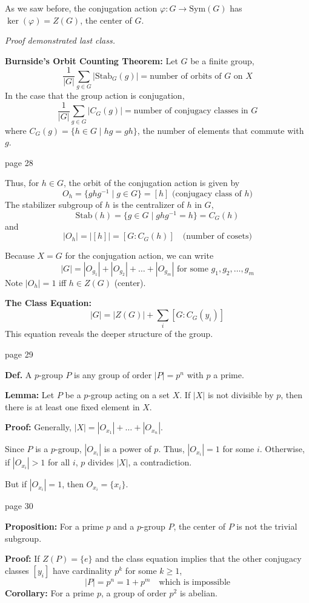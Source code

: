 \documentclass{article}
\begin{document}
As we saw before, the conjugation action $\varphi: G \to \text{Sym}(G)$ has $\ker(\varphi) = Z(G)$, the center of $G$.

\textit{Proof demonstrated last class.}

\textbf{Burnside's Orbit Counting Theorem:}
Let $G$ be a finite group,
\[
\frac{1}{|G|} \sum_{g \in G} | \text{Stab}_G(g) | = \text{number of orbits of } G \text{ on } X
\]
In the case that the group action is conjugation,
\[
\frac{1}{|G|} \sum_{g \in G} | C_G(g) | = \text{number of conjugacy classes in } G
\]
where $C_G(g) = \{ h \in G \mid hg = gh \}$, the number of elements that commute with $g$.

\newpage
\noindent page 28

Thus, for $h \in G$, the orbit of the conjugation action is given by
\[
O_h = \{ ghg^{-1} \mid g \in G \} = [h] \text{ (conjugacy class of } h \text{)}
\]
The stabilizer subgroup of $h$ is the centralizer of $h$ in $G$,
\[
\text{Stab}(h) = \{ g \in G \mid ghg^{-1} = h \} = C_G(h)
\]
and
\[
|O_h| = |[h]| = [G : C_G(h)] \quad \text{(number of cosets)}
\]

Because $X = G$ for the conjugation action, we can write
\[
|G| = |O_{g_1}| + |O_{g_2}| + \ldots + |O_{g_m}| \text{ for some } g_1, g_2, \ldots, g_m
\]
Note $|O_h| = 1$ iff $h \in Z(G)$ (center).

\textbf{The Class Equation:}
\[
|G| = |Z(G)| + \sum_{i} [G : C_G(y_i)]
\]
This equation reveals the deeper structure of the group.

\newpage
\noindent page 29

\textbf{Def.} A $p$-group $P$ is any group of order $|P| = p^n$ with $p$ a prime.

\textbf{Lemma:} Let $P$ be a $p$-group acting on a set $X$. If $|X|$ is not divisible by $p$, then there is at least one fixed element in $X$.

\textbf{Proof:} Generally, $|X| = |O_{x_1}| + \ldots + |O_{x_n}|$.

Since $P$ is a $p$-group, $|O_{x_i}|$ is a power of $p$.
Thus, $|O_{x_i}| = 1$ for some $i$.
Otherwise, if $|O_{x_i}| > 1$ for all $i$, $p$ divides $|X|$, a contradiction.

But if $|O_{x_i}| = 1$, then $O_{x_i} = \{x_i\}$.

\newpage
\noindent page 30

\textbf{Proposition:} For a prime $p$ and a $p$-group $P$, the center of $P$ is not the trivial subgroup.

\textbf{Proof:} If $Z(P) = \{e\}$ and the class equation implies that the other conjugacy classes $[y_i]$ have cardinality $p^k$ for some $k \geq 1$,
\[
|P| = p^n = 1 + p^m \quad \text{which is impossible}
\]
\textbf{Corollary:} For a prime $p$, a group of order $p^2$ is abelian.
\end{document}
